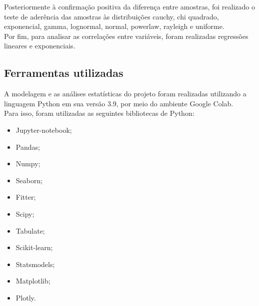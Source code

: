 Posteriormente à confirmação positiva da diferença entre amostras, foi realizado o teste de aderência das amostras às distribuições cauchy, chi quadrado, exponencial, gamma, lognormal, normal, powerlaw, rayleigh e uniforme.\\
Por fim, para analisar as correlações entre variáveis, foram realizadas regressões lineares e exponenciais.\\

\subsection{Ferramentas utilizadas}
A modelagem e as análises estatísticas do projeto foram realizadas utilizando a linguagem Python em sua versão 3.9, por meio do ambiente Google Colab.\\
Para isso, foram utilizadas as seguintes bibliotecas de Python:

\begin{itemize}
    \item Jupyter-notebook;
    \item Pandas;
    \item Numpy;
    \item Seaborn;
    \item Fitter;
    \item Scipy;
    \item Tabulate;
    \item Scikit-learn;
    \item Statsmodels;
    \item Matplotlib;
    \item Plotly.
\end{itemize}